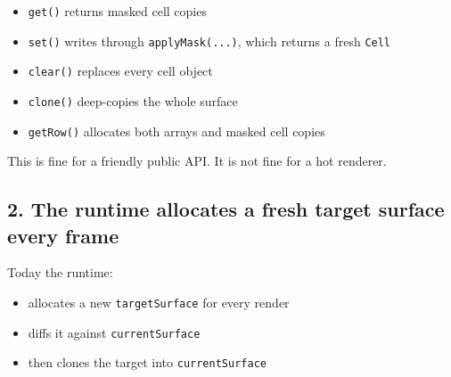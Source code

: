 \begin{itemize}
\tightlist
\item
  \texttt{g\allowbreak{}e\allowbreak{}t\allowbreak{}(\allowbreak{})} returns masked cell copies
\item
  \texttt{s\allowbreak{}e\allowbreak{}t\allowbreak{}(\allowbreak{})} writes through \texttt{a\allowbreak{}p\allowbreak{}p\allowbreak{}l\allowbreak{}y\allowbreak{}M\allowbreak{}a\allowbreak{}s\allowbreak{}k\allowbreak{}(\allowbreak{}.\allowbreak{}.\allowbreak{}.\allowbreak{})}, which returns a fresh \texttt{C\allowbreak{}e\allowbreak{}l\allowbreak{}l}
\item
  \texttt{c\allowbreak{}l\allowbreak{}e\allowbreak{}a\allowbreak{}r\allowbreak{}(\allowbreak{})} replaces every cell object
\item
  \texttt{c\allowbreak{}l\allowbreak{}o\allowbreak{}n\allowbreak{}e\allowbreak{}(\allowbreak{})} deep-copies the whole surface
\item
  \texttt{g\allowbreak{}e\allowbreak{}t\allowbreak{}R\allowbreak{}o\allowbreak{}w\allowbreak{}(\allowbreak{})} allocates both arrays and masked cell copies
\end{itemize}

This is fine for a friendly public API. It is not fine for a hot renderer.

\subsection{2. The runtime allocates a fresh target surface every frame}\label{record-052-the-runtime-allocates-a-fresh-target-surface-every-frame}

Today the runtime:

\begin{itemize}
\tightlist
\item
  allocates a new \texttt{t\allowbreak{}a\allowbreak{}r\allowbreak{}g\allowbreak{}e\allowbreak{}t\allowbreak{}S\allowbreak{}u\allowbreak{}r\allowbreak{}f\allowbreak{}a\allowbreak{}c\allowbreak{}e} for every render
\item
  diffs it against \texttt{c\allowbreak{}u\allowbreak{}r\allowbreak{}r\allowbreak{}e\allowbreak{}n\allowbreak{}t\allowbreak{}S\allowbreak{}u\allowbreak{}r\allowbreak{}f\allowbreak{}a\allowbreak{}c\allowbreak{}e}
\item
  then clones the target into \texttt{c\allowbreak{}u\allowbreak{}r\allowbreak{}r\allowbreak{}e\allowbreak{}n\allowbreak{}t\allowbreak{}S\allowbreak{}u\allowbreak{}r\allowbreak{}f\allowbreak{}a\allowbreak{}c\allowbreak{}e}
\end{itemize}

